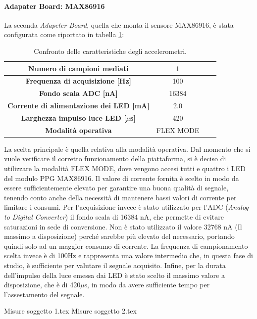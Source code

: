 \paragraph{Adapater Board: MAX86916}
La seconda \textit{Adapeter Board}, quella che monta il sensore MAX86916, è stata configurata come riportato in tabella \ref{tab:ConfigMAX86916}:
\begin{table}[h]
	\renewcommand{\arraystretch}{1.5}
	\centering
	\footnotesize
	\begin{tabular}{cccc}
		\textbf{Numero di campioni mediati} & 1 \\ \hline
		\textbf{Frequenza di acquisizione [Hz]} & 100 \\ \hline
		\textbf{Fondo scala ADC [nA]} & 16384 \\ \hline
		\textbf{Corrente di alimentazione dei LED [mA]} & 2.0 \\ \hline
		\textbf{Larghezza impulso luce LED [$\mu$s]} & 420 \\ \hline
		\textbf{Modalità operativa} & FLEX MODE \\ \hline
	\end{tabular}
	\caption{Confronto delle caratteristiche degli accelerometri.}
	\label{tab:ConfigMAX86916}
\end{table}
La scelta principale è quella relativa alla modalità operativa. Dal momento che si vuole verificare il corretto funzionamento della piattaforma, si è deciso di utilizzare la modalità FLEX MODE, dove vengono accesi tutti e quattro i LED del modulo PPG MAX86916. Il valore di corrente fornita è scelto in modo da essere sufficientemente elevato per garantire una buona qualità di segnale, tenendo conto anche della necessità di mantenere bassi valori di corrente per limitare i consumi. Per l'acquisizione invece è stato utilizzato per l'ADC (\textit{Analog to Digital Converter}) il fondo scala di 16384 nA, che permette di evitare saturazioni in sede di conversione. Non è stato utilizzato il valore 32768 nA (Il massimo a disposizione) perché sarebbe più elevato del necessario, portando quindi solo ad un maggior consumo di corrente. La frequenza di campionamento scelta invece è di 100Hz e rappresenta una valore intermedio che, in questa fase di studio, è sufficiente per valutare il segnale acquisito. Infine, per la durata dell'impulso della luce emessa dai LED è stato scelto il massimo valore a disposizione, che è di 420$\mu$s, in modo da avere sufficiente tempo per l'assestamento del segnale. 

{Misure soggetto 1.tex}
{Misure soggetto 2.tex}
